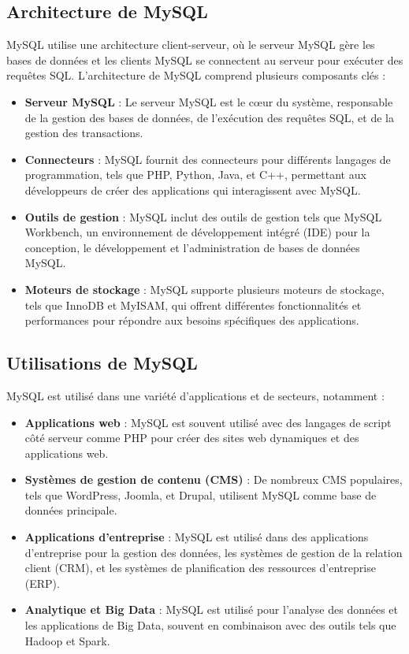 \documentclass{article}
\begin{document}
\subsection{Architecture de MySQL}
MySQL utilise une architecture client-serveur, où le serveur MySQL gère les bases de données et les clients MySQL se connectent au serveur pour exécuter des requêtes SQL. L'architecture de MySQL comprend plusieurs composants clés :
\begin{itemize}
  \item \textbf{Serveur MySQL} : Le serveur MySQL est le cœur du système, responsable de la gestion des bases de données, de l'exécution des requêtes SQL, et de la gestion des transactions.
  \item \textbf{Connecteurs} : MySQL fournit des connecteurs pour différents langages de programmation, tels que PHP, Python, Java, et C++, permettant aux développeurs de créer des applications qui interagissent avec MySQL.
  \item \textbf{Outils de gestion} : MySQL inclut des outils de gestion tels que MySQL Workbench, un environnement de développement intégré (IDE) pour la conception, le développement et l'administration de bases de données MySQL.
  \item \textbf{Moteurs de stockage} : MySQL supporte plusieurs moteurs de stockage, tels que InnoDB et MyISAM, qui offrent différentes fonctionnalités et performances pour répondre aux besoins spécifiques des applications.
\end{itemize}

\subsection{Utilisations de MySQL}
MySQL est utilisé dans une variété d'applications et de secteurs, notamment :
\begin{itemize}
  \item \textbf{Applications web} : MySQL est souvent utilisé avec des langages de script côté serveur comme PHP pour créer des sites web dynamiques et des applications web.
  \item \textbf{Systèmes de gestion de contenu (CMS)} : De nombreux CMS populaires, tels que WordPress, Joomla, et Drupal, utilisent MySQL comme base de données principale.
  \item \textbf{Applications d'entreprise} : MySQL est utilisé dans des applications d'entreprise pour la gestion des données, les systèmes de gestion de la relation client (CRM), et les systèmes de planification des ressources d'entreprise (ERP).
  \item \textbf{Analytique et Big Data} : MySQL est utilisé pour l'analyse des données et les applications de Big Data, souvent en combinaison avec des outils tels que Hadoop et Spark.
\end{itemize}
\end{document}
